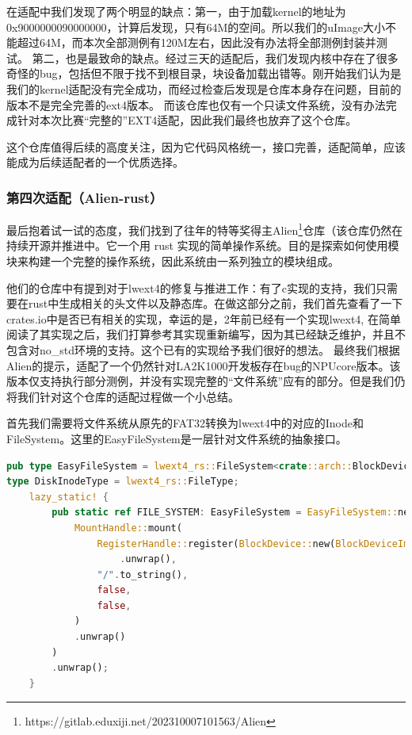 在适配中我们发现了两个明显的缺点：第一，由于加载kernel的地址为0x9000000090000000，计算后发现，只有64M的空间。所以我们的uImage大小不能超过64M，而本次全部测例有120M左右，因此没有办法将全部测例封装并测试。
第二，也是最致命的缺点。经过三天的适配后，我们发现内核中存在了很多奇怪的bug，包括但不限于找不到根目录，块设备加载出错等。刚开始我们认为是我们的kernel适配没有完全成功，而经过检查后发现是仓库本身存在问题，目前的版本不是完全完善的ext4版本。
而该仓库也仅有一个只读文件系统，没有办法完成针对本次比赛“完整的”EXT4适配，因此我们最终也放弃了这个仓库。

这个仓库值得后续的高度关注，因为它代码风格统一，接口完善，适配简单，应该能成为后续适配者的一个优质选择。

\subsubsection{第四次适配（Alien-rust）}

最后抱着试一试的态度，我们找到了往年的特等奖得主Alien\footnote{https://gitlab.eduxiji.net/202310007101563/Alien}仓库（该仓库仍然在持续开源并推进中。它一个用 rust 实现的简单操作系统。目的是探索如何使用模块来构建一个完整的操作系统，因此系统由一系列独立的模块组成。

他们的仓库中有提到对于lwext4的修复与推进工作：有了c实现的支持，我们只需要在rust中生成相关的头文件以及静态库。在做这部分之前，我们首先查看了一下crates.io中是否已有相关的实现，幸运的是，2年前已经有一个实现lwext4, 在简单阅读了其实现之后，我们打算参考其实现重新编写，因为其已经缺乏维护，并且不包含对no_std环境的支持。这个已有的实现给予我们很好的想法。
最终我们根据Alien的提示，适配了一个仍然针对LA2K1000开发板存在bug的NPUcore版本。该版本仅支持执行部分测例，并没有实现完整的“文件系统”应有的部分。但是我们仍将我们针对这个仓库的适配过程做一个小总结。

首先我们需要将文件系统从原先的FAT32转换为lwext4中的对应的Inode和FileSystem。这里的EasyFileSystem是一层针对文件系统的抽象接口。
\begin{lstlisting}[language={Rust}, caption={FILE_SYSTEM修改}]
pub type EasyFileSystem = lwext4_rs::FileSystem<crate::arch::BlockDeviceImpl>;
type DiskInodeType = lwext4_rs::FileType;
    lazy_static! {
        pub static ref FILE_SYSTEM: EasyFileSystem = EasyFileSystem::new(
            MountHandle::mount(
                RegisterHandle::register(BlockDevice::new(BlockDeviceImpl::new()), "shit".to_string())
                    .unwrap(),
                "/".to_string(),
                false,
                false,
            )
            .unwrap()
        )
        .unwrap();
    }
\end{lstlisting}

